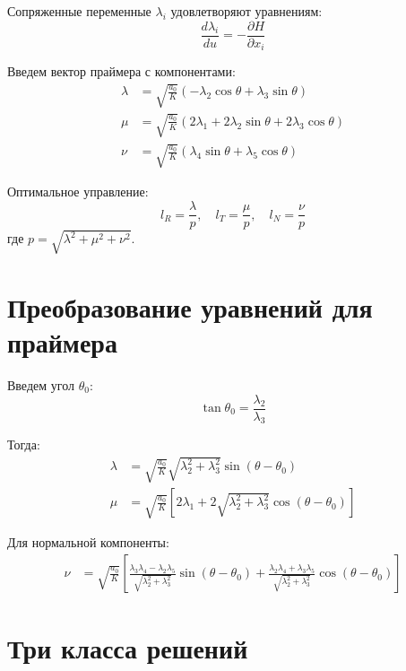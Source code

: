 \documentclass[12pt]{article}
\begin{document}
Сопряженные переменные $\lambda_i$ удовлетворяют уравнениям:
\begin{equation}
\frac{d\lambda_i}{du} = -\frac{\partial H}{\partial x_i}
\end{equation}

Введем вектор праймера с компонентами:
\begin{align}
\lambda &= \sqrt{\frac{a_0}{K}}(-\lambda_2\cos\theta + \lambda_3\sin\theta) \tag{8} \\
\mu &= \sqrt{\frac{a_0}{K}}(2\lambda_1 + 2\lambda_2\sin\theta + 2\lambda_3\cos\theta) \tag{9} \\
\nu &= \sqrt{\frac{a_0}{K}}(\lambda_4\sin\theta + \lambda_5\cos\theta) \tag{10}
\end{align}

Оптимальное управление:
\begin{equation}
l_R = \frac{\lambda}{p}, \quad l_T = \frac{\mu}{p}, \quad l_N = \frac{\nu}{p} \tag{7}
\end{equation}
где $p = \sqrt{\lambda^2 + \mu^2 + \nu^2}$.

\section{Преобразование уравнений для праймера}

Введем угол $\theta_0$:
\begin{equation}
\tan\theta_0 = \frac{\lambda_2}{\lambda_3} \tag{14}
\end{equation}

Тогда:
\begin{align}
\lambda &= \sqrt{\frac{a_0}{K}}\sqrt{\lambda_2^2 + \lambda_3^2}\sin(\theta - \theta_0) \tag{11} \\
\mu &= \sqrt{\frac{a_0}{K}}\left[2\lambda_1 + 2\sqrt{\lambda_2^2 + \lambda_3^2}\cos(\theta - \theta_0)\right] \tag{12}
\end{align}

Для нормальной компоненты:
\begin{align}
\nu &= \sqrt{\frac{a_0}{K}}\left[\frac{\lambda_3\lambda_4 - \lambda_2\lambda_5}{\sqrt{\lambda_2^2 + \lambda_3^2}}\sin(\theta - \theta_0) + \frac{\lambda_2\lambda_4 + \lambda_3\lambda_5}{\sqrt{\lambda_2^2 + \lambda_3^2}}\cos(\theta - \theta_0)\right] \tag{13}
\end{align}

\section{Три класса решений}
\end{document}
